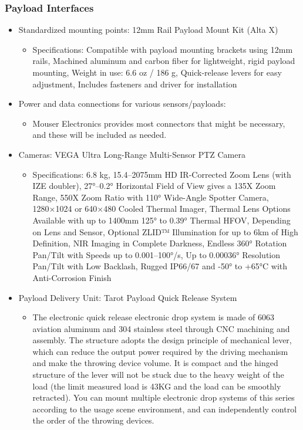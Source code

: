 \subsubsection{Payload Interfaces}
\begin{itemize}
    \item Standardized mounting points: 12mm Rail Payload Mount Kit (Alta X)
    \begin{itemize}
        \item Specifications: Compatible with payload mounting brackets using 12mm rails, Machined aluminum and carbon fiber for lightweight, rigid payload mounting, Weight in use: 6.6 oz / 186 g, Quick-release levers for easy adjustment, Includes fasteners and driver for installation
    \end{itemize}
    \item Power and data connections for various sensors/payloads:
    \begin{itemize}
        \item Mouser Electronics provides most connectors that might be necessary, and these will be included as needed.
    \end{itemize}
    \item Cameras: VEGA Ultra Long-Range Multi-Sensor PTZ Camera
    \begin{itemize}
        \item Specifications: 6.8 kg, 15.4–2075mm HD IR-Corrected Zoom Lens (with IZE doubler), 27°–0.2° Horizontal Field of View gives a 135X Zoom Range, 550X Zoom Ratio with 110° Wide-Angle Spotter Camera, 1280×1024 or 640×480 Cooled Thermal Imager, Thermal Lens Options Available with up to 1400mm 125° to 0.39° Thermal HFOV, Depending on Lens and Sensor, Optional ZLID™ Illumination for up to 6km of High Definition, NIR Imaging in Complete Darkness, Endless 360° Rotation Pan/Tilt with Speeds up to 0.001–100°/s, Up to 0.00036° Resolution Pan/Tilt with Low Backlash, Rugged IP66/67 and -50° to +65°C with Anti-Corrosion Finish
    \end{itemize}
     \item Payload Delivery Unit: Tarot Payload Quick Release System
    \begin{itemize}
        \item The electronic quick release electronic drop system is made of 6063 aviation aluminum and 304 stainless steel through CNC machining and assembly. The structure adopts the design principle of mechanical lever, which can reduce the output power required by the driving mechanism and make the throwing device volume. It is compact and the hinged structure of the lever will not be stuck due to the heavy weight of the load (the limit measured load is 43KG and the load can be smoothly retracted). You can mount multiple electronic drop systems of this series according to the usage scene environment, and can independently control the order of the throwing devices.
    \end{itemize}
\end{itemize}

